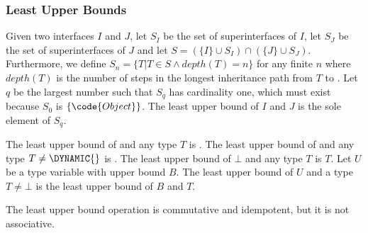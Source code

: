 \documentclass{article}
\begin{document}
\subsubsection{Least Upper Bounds}


\LMHash{}
Given two interfaces $I$ and $J$,
let $S_I$ be the set of superinterfaces of $I$,
let $S_J$ be the set of superinterfaces of $J$
and let $S = (\{I\} \cup S_I) \cap (\{J\} \cup S_J)$.
Furthermore,
we define $S_n = \{T | T \in S \wedge depth(T) = n\}$ for any finite $n$
where $depth(T)$ is the number of steps in the longest inheritance path
from $T$ to .
Let $q$ be the largest number such that $S_q$ has cardinality one,
which must exist because $S_0$ is $\{\code{Object}\}$.
The least upper bound of $I$ and $J$ is the sole element of $S_q$.

\LMHash{}
The least upper bound of \DYNAMIC{} and any type $T$ is \DYNAMIC{}.
The least upper bound of \VOID{} and any type $T \ne \DYNAMIC{}$ is \VOID{}.
The least upper bound of $\bot$ and any type $T$ is $T$.
Let $U$ be a type variable with upper bound $B$.
The least upper bound of $U$ and a type $T \ne \bot$ is the least upper bound of $B$ and $T$.

\LMHash{}
The least upper bound operation is commutative and idempotent,
but it is not associative.

\end{document}
